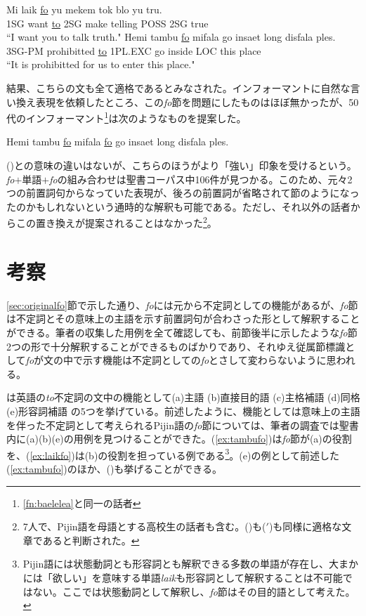 \begin{exe}
\ex\label{ex:laikfo}
\gll Mi laik \underline{fo} yu mekem tok blo yu tru.\\
1SG want \underline{to} 2SG make telling POSS 2SG true\\
\glt ``I want you to talk truth."
\ex
\gll Hemi tambu \underline{fo} mifala go insaet long disfala ples.\\
3SG-PM prohibitted \underline{to} 1PL.EXC go inside LOC this place\\
\glt ``It is prohibitted for us to enter this place."
\end{exe}

結果、こちらの文も全て適格であるとみなされた。インフォーマントに自然な言い換え表現を依頼したところ、この\textit{fo}節を問題にしたものはほぼ無かったが、50代のインフォーマント\footnote{
\ref{fn:baelelea}と同一の話者}は次のようなものを提案した。

\begin{exe}
 Hemi tambu \underline{fo} mifala \underline{fo} go insaet long disfala ples.
\end{exe}

()との意味の違いはないが、こちらのほうがより「強い」印象を受けるという。\textit{fo}$+$単語$+$\textit{fo}の組み合わせは聖書コーパス中106件が見つかる。このため、元々2つの前置詞句からなっていた表現が、後ろの前置詞が省略されて節のようになったのかもしれないという通時的な解釈も可能である。ただし、それ以外の話者からこの置き換えが提案されることはなかった\footnote{
7人で、Pijin語を母語とする高校生の話者も含む。()も($'$)も同様に適格な文章であると判断された。}。
\section{考察}\label{sec:fothink}
\ref{sec:originalfo}節で示した通り、\textit{fo}には元から不定詞としての機能があるが、\textit{fo}節は不定詞とその意味上の主語を示す前置詞句が合わさった形として解釈することができる。筆者の収集した用例を全て確認しても、前節後半に示したような\textit{fo}節2つの形で十分解釈することができるものばかりであり、それゆえ従属節標識として\textit{fo}が文の中で示す機能は不定詞としての\textit{fo}とさして変わらないように思われる。

\cite{english}は英語の\textit{to}不定詞の文中の機能として(a)主語 (b)直接目的語 (c)主格補語 (d)同格 (e)形容詞補語 の5つを挙げている。前述したように、機能としては意味上の主語を伴った不定詞として考えられるPijin語の\textit{fo}節については、筆者の調査では聖書内に(a)(b)(e)の用例を見つけることができた。(\ref{ex:tambufo})は\textit{fo}節が(a)の役割を、(\ref{ex:laikfo})は(b)の役割を担っている例である\footnote{
Pijin語には状態動詞とも形容詞とも解釈できる多数の単語が存在し\cite[xvi]{dictionary}、大まかには「欲しい」を意味する単語\textit{laik}も形容詞として解釈することは不可能ではない。ここでは状態動詞として解釈し、\textit{fo}節はその目的語として考えた。
}。(e)の例として前述した(\ref{ex:tambufo})のほか、()も挙げることができる。

